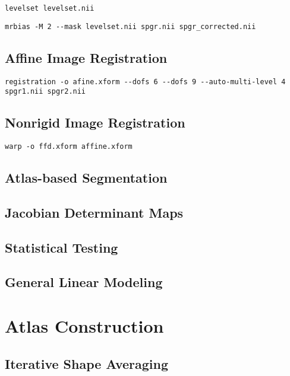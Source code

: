 \documentclass{InsightArticle}
\begin{document}
\begin{verbatim}
levelset levelset.nii
\end{verbatim}

\begin{verbatim}
mrbias -M 2 --mask levelset.nii spgr.nii spgr_corrected.nii
\end{verbatim}

\subsection{Affine Image Registration}


\begin{verbatim}
registration -o afine.xform --dofs 6 --dofs 9 --auto-multi-level 4 spgr1.nii spgr2.nii
\end{verbatim}

\subsection{Nonrigid Image Registration}

\cite{RuecSonoHaye:1999} \cite{RohlMaur:2003}

\begin{verbatim}
warp -o ffd.xform affine.xform
\end{verbatim}

\subsection{Atlas-based Segmentation}

\subsection{Jacobian Determinant Maps}

\subsection{Statistical Testing}

\subsection{General Linear Modeling}

\section{Atlas Construction}

\subsection{Iterative Shape Averaging}
\end{document}
